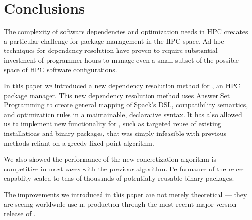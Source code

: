 \section{Conclusions}
\label{sec:conclusions}

The complexity of software dependencies and optimization needs in HPC creaates a particular challenge for package management in the HPC space.
Ad-hoc techniques for dependency resolution have proven to require substantial investment of programmer hours to manage even a small subset of the possible space of HPC software configurations.

In this paper we introduced a new dependency resolution method for \spack{}, an HPC package manager.
This new dependency resolution method uses Answer Set Programming to create general mapping of Spack's DSL, compatibility semantics, and optimization rules in a maintainable, declarative syntax.
It has also allowed us to implement new functionality for \spack{}, such as targeted reuse of existing installations and binary packages, that was simply infeasible with previous methods reliant on a greedy fixed-point algorithm.

We also showed the performance of the new concretization algorithm is competitive in most cases with the previous algorithm.
Performance of the reuse capablity scaled to tens of thousands of potentially reusable binary packages.

The improvements we introduced in this paper are not merely theoretical --- they are seeing worldwide use in production through the most recent major version release of \spack{}.
